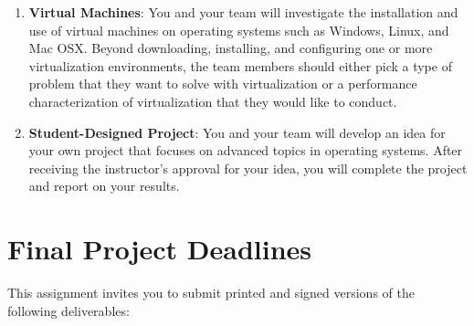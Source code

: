 \begin{enumerate}
  \item {\bf Virtual Machines}: You and your team will investigate the installation and use of virtual machines on
    operating systems such as Windows, Linux, and Mac OSX.  Beyond downloading, installing, and configuring one or more
    virtualization environments, the team members should either pick a type of problem that they want to solve with
    virtualization or a performance characterization of virtualization that they would like to conduct.

  \item {\bf Student-Designed Project}: You and your team will develop an idea for your own project that focuses on
    advanced topics in operating systems. After receiving the instructor's approval for your idea, you will complete the
    project and report on your results.

\end{enumerate}



\section*{Final Project Deadlines}

This assignment invites you to submit printed and signed versions of the following deliverables:

